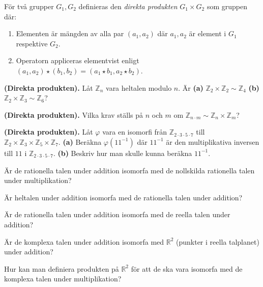 \documentclass[11pt,fleqn]{book} %
\begin{document}
\begin{definition}[]
  För två grupper \(G_1, G_2\) definieras den \textit{direkta produkten} \(G_1 \times G_2\) som gruppen där:
  \begin{enumerate}
    \item Elementen är mängden av alla par \((a_1, a_2)\) där \(a_1, a_2\) är element i \(G_1\) respektive \(G_2\).
    \item Operatorn appliceras elementvist enligt \((a_1, a_2)  \star (b_1, b_2) = (a_1  \star b_1, a_2  \star b_2)\).
  \end{enumerate}
\end{definition}

\begin{problem} \textbf{(Direkta produkten).} 
  Låt \(\mathbb{Z}_n \) vara heltalen modulo \(n\). Är \textbf{(a)} \(\mathbb{Z} _2 \times \mathbb{Z} _2 \sim \mathbb{Z} _4\) \textbf{(b)} \(\mathbb{Z} _2 \times \mathbb{Z} _3 \sim \mathbb{Z} _6\)? %
\end{problem}

\begin{problem} \textbf{(Direkta produkten).} 
  Vilka krav ställs på \(n\) och \(m\) om \(\mathbb{Z} _{n  \cdot m} \sim \mathbb{Z} _n \times \mathbb{Z} _m\)?
\end{problem}

\begin{problem} \textbf{(Direkta produkten).} 
  Låt \(\varphi \) vara en isomorfi från \(\mathbb{Z} _ {2  \cdot 3  \cdot 5  \cdot 7}\) till \(\mathbb{Z} _2 \times \mathbb{Z} _3 \times \mathbb{Z} _5 \times \mathbb{Z} _7\). \textbf{(a)} Beräkna \(\varphi (11 ^{-1})\) där \(11 ^{-1}\) är den multiplikativa inversen till \(11\) i \(\mathbb{Z} _{2  \cdot 3  \cdot 5  \cdot 7}\). \textbf{(b)} Beskriv hur man skulle kunna beräkna \(11 ^{-1}\).
\end{problem}



\begin{problem} %
  Är de rationella talen under addition isomorfa med de nollskilda rationella talen under multiplikation?
\end{problem}

\begin{problem}
  Är heltalen under addition isomorfa med de rationella talen under addition?
\end{problem}

\begin{problem}
  Är de rationella talen under addition isomorfa med de reella talen under addition?
\end{problem}

\begin{problem}
  Är de komplexa talen under addition isomorfa med \(\mathbb{R} ^2\) (punkter i reella talplanet) under addition?
\end{problem}

\begin{problem}
  Hur kan man definiera produkten på \(\mathbb{R} ^2\) för att de ska vara isomorfa med de komplexa talen under multiplikation?
\end{problem}


\end{document}
